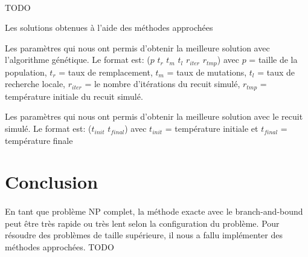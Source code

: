 \documentclass[12pt,letterpaper,twoside]{article}
\begin{document}
			\paragraph*{}
				TODO

			\begin{table}[H]
				\centering
				
				\caption{Les solutions obtenues à l'aide des méthodes approchées}
				\label{table:approached-solutions}
			\end{table}

			\begin{table}[H]
				\centering
				
				\caption{Les paramètres qui nous ont permis d'obtenir la meilleure solution avec l'algorithme génétique.
					Le format est: (\(p\) \(t_r\) \(t_m\) \(t_l\) \(r_{iter}\) \(r_{tmp}\)) avec \(p\) = taille de la population,
					\(t_r\) = taux de remplacement, \(t_m\) = taux de mutations, \(t_l\) = taux de recherche locale, \(r_{iter}\) =
					le nombre d'itérations du recuit simulé, \(r_{tmp}\) = température initiale du recuit simulé.}
				\label{table:genetic-parameters}
			\end{table}

			\begin{table}[H]
				\centering
				
				\caption{Les paramètres qui nous ont permis d'obtenir la meilleure solution avec le recuit simulé.
					Le format est: (\(t_{init}\) \(t_{final}\)) avec \(t_{init}\) = température initiale et
					\(t_{final}\) = température finale}
				\label{table:genetic-parameters}
			\end{table}
	\section{Conclusion}
		\paragraph*{}
			En tant que problème NP complet, la méthode exacte avec le branch-and-bound peut être très rapide ou très lent selon la configuration du problème.
			Pour résoudre des problèmes de taille supérieure, il nous a fallu implémenter des méthodes approchées.
			TODO
	\newpage\printbibliography[heading=bibintoc]{}
\end{document}
